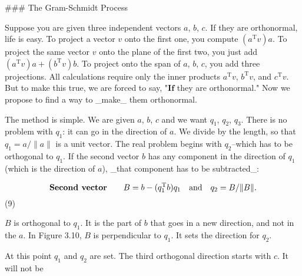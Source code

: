 

### The Gram-Schmidt Process

Suppose you are given three independent vectors \(a\), \(b\), \(c\). If they are orthonormal, life is easy. To project a vector \(v\) onto the first one, you compute \((a^{\mathrm{T}}v)a\). To project the same vector \(v\) onto the plane of the first two, you just add \((a^{\mathrm{T}}v)a+(b^{\mathrm{T}}v)b\). To project onto the span of \(a\), \(b\), \(c\), you add three projections. All calculations require only the inner products \(a^{\mathrm{T}}v\), \(b^{\mathrm{T}}v\), and \(c^{\mathrm{T}}v\). But to make this true, we are forced to say, "\(\boldsymbol{If}\) they are orthonormal." Now we propose to find a way to _make_ them orthonormal.

The method is simple. We are given \(a\), \(b\), \(c\) and we want \(q_{1}\), \(q_{2}\), \(q_{3}\). There is no problem with \(q_{1}\): it can go in the direction of \(a\). We divide by the length, so that \(q_{1}=a/\|a\|\) is a unit vector. The real problem begins with \(q_{2}\)--which has to be orthogonal to \(q_{1}\). If the second vector \(b\) has any component in the direction of \(q_{1}\) (which is the direction of \(a\)), _that component has to be subtracted_:

\[\text{\bf Second vector}\qquad B=b-(q_{1}^{\mathrm{T}}b)q_{1}\quad\text{and} \quad q_{2}=B/\|B\|.\] (9)

\(B\) is orthogonal to \(q_{1}\). It is the part of \(b\) that goes in a new direction, and not in the \(a\). In Figure 3.10, \(B\) is perpendicular to \(q_{1}\). It sets the direction for \(q_{2}\).

At this point \(q_{1}\) and \(q_{2}\) are set. The third orthogonal direction starts with \(c\). It will not be